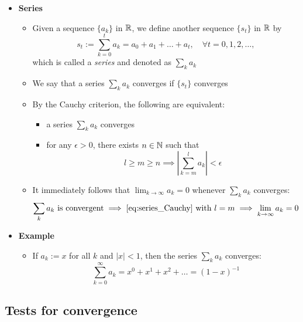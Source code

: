 \documentclass[12pt,a4paper]{article}
\begin{document}
\begin{itemize}
\item \textbf{Series}
  \begin{itemize}
  \item Given a sequence $\{a_{k}\}$ in $\mathbb{R}$,
    we define another sequence $\{s_{t}\}$ in $\mathbb{R}$ by
    \begin{equation}\nonumber%
      \textstyle s_{t} := \sum_{k=0}^{t}a_{k} = a_{0} + a_{1} + \ldots + a_{t}, \quad \forall t = 0, 1, 2, \ldots,
    \end{equation}
    which is called a \emph{series} and denoted as $\sum_{k} a_{k}$
  \item We say that a series $\sum_{k} a_{k}$ converges if $\{s_{t}\}$ converges
  \item By the Cauchy criterion, the following are equivalent:
    \begin{itemize}
    \item a series $\sum_{k} a_{k}$ converges
    \item for any $\epsilon > 0$, there exists $n \in \mathbb{N}$ such that
    \begin{equation}\label{eq:series_Cauchy}%
      \textstyle l\geq m\geq n  \implies \left| \sum_{k=m}^{l}a_{k}\right|< \epsilon
    \end{equation}
    \end{itemize}
  \item It immediately follows that
    $\lim_{k\to\infty}a_{k}=0$
    whenever $\sum_{k} a_{k}$ converges:
    \begin{equation}\nonumber%
      \text{$\sum_{k} a_{k}$ is convergent}
      \implies
      \text{\eqref{eq:series_Cauchy} with $l=m$}
      \implies
      \lim_{k\to\infty} a_{k} = 0
    \end{equation}
  \end{itemize}

\item \textbf{Example}
  \begin{itemize}
  \item If $a_{k}:=x$ for all $k$ and $|x|<1$, then the series $\sum_{k}a_{k}$ converges:
    \begin{equation}\label{eq:xk}%
      \textstyle \sum_{k=0}^{\infty}a_{k}
      =
      x^{0} + 
      x^{1} + 
      x^{2} + \ldots
      =
      (1-x)^{-1}
    \end{equation}
  \end{itemize}
 
\end{itemize}

\subsection{Tests for convergence}
\end{document}
